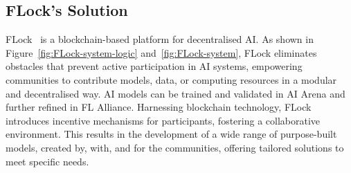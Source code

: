 \documentclass[conference]{IEEEtran}
\newcommand{\FL}{\ac{FL} Alliance\xspace}
\newcommand{\SNT}{{AI Arena}\xspace}
\begin{document}
\subsection{FLock's Solution}




FLock~\cite{dong2022FLock,dong2023defending} is a blockchain-based platform for decentralised AI.  As shown in Figure~\ref{fig:FLock-system-logic} and~\ref{fig:FLock-system}, FLock eliminates obstacles that prevent active participation in AI systems, empowering communities to contribute models, data, or computing resources in a modular and decentralised way. AI models can be trained and validated in \SNT and further refined in \FL. Harnessing blockchain technology, FLock introduces incentive mechanisms for participants, fostering a collaborative environment. This results in the development of a wide range of purpose-built models, created by, with, and for the communities, offering tailored solutions to meet specific needs.







\end{document}
